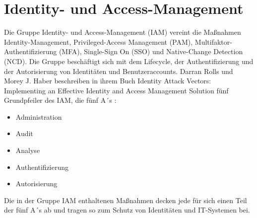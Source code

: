 \section{Identity- und Access-Management}
Die Gruppe \glqq{}Identity- und Access-Management\grqq{} (IAM) vereint die Maßnahmen \glqq{}Identity-Management\grqq{}, \glqq{}Privileged-Access Management\grqq{} (PAM), \glqq{}Multifaktor-Authentifizierung\grqq{} (MFA), \glqq{}Single-Sign On\grqq{} (SSO) und \glqq{}Native-Change Detection\grqq{} (NCD). Die Gruppe beschäftigt sich mit dem Lifecycle, der Authentifizierung und der Autorisierung von Identitäten und Benutzeraccounts.
\bigbreak
Darran Rolls und Morey J. Haber beschreiben in ihrem Buch \glqq{}Identity Attack Vectors: Implementing an Effective Identity and Access Management Solution\grqq{} fünf Grundpfeiler des IAM, die fünf \glqq{}A´s\grqq{} \autocite{rolls_haber_2020}:

\begin{itemize}
    \item Administration
    \item Audit
    \item Analyse
    \item Authentifizierung
    \item Autorisierung
\end{itemize}
\bigbreak
Die in der Gruppe IAM enthaltenen Maßnahmen decken jede für sich einen Teil der fünf A´s ab und tragen so zum Schutz von Identitäten und IT-Systemen bei. 

